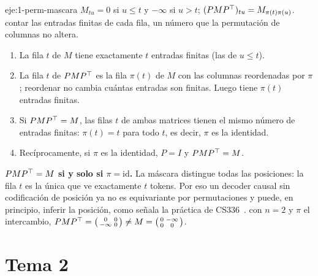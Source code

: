 \begin{solucion}{eje:1-perm-mascara}
\datos $M_{tu}=0$ si $u\le t$ y $-\infty$ si $u>t$; $(PMP^{\top})_{tu}=M_{\pi(t)\pi(u)}$.
\planteamiento contar las entradas finitas de cada fila, un número que la permutación de columnas no altera.
\pasos
\begin{enumerate}[label=\arabic*.]
  \item La fila $t$ de $M$ tiene exactamente $t$ entradas finitas (las de $u\le t$).
  \item La fila $t$ de $PMP^{\top}$ es la fila $\pi(t)$ de $M$ con las columnas reordenadas por $\pi$; reordenar no cambia cuántas entradas son finitas. Luego tiene $\pi(t)$ entradas finitas.
  \item Si $PMP^{\top}=M$, las filas $t$ de ambas matrices tienen el mismo número de entradas finitas: $\pi(t)=t$ para todo $t$, es decir, $\pi$ es la identidad.
  \item Recíprocamente, si $\pi$ es la identidad, $P=I$ y $PMP^{\top}=M$.
\end{enumerate}
\resultado \textbf{$PMP^{\top}=M$ si y solo si $\pi=\mathrm{id}$.} La máscara distingue todas las posiciones: la fila $t$ es la única que ve exactamente $t$ tokens. Por eso un decoder causal sin codificación de posición ya no es equivariante por permutaciones y puede, en principio, inferir la posición, como señala la práctica de CS336~\cite[§7.3]{cs336}.
\comprobacion con $n=2$ y $\pi$ el intercambio, $PMP^{\top}=\bigl(\begin{smallmatrix}0&0\\-\infty&0\end{smallmatrix}\bigr)\ne M=\bigl(\begin{smallmatrix}0&-\infty\\0&0\end{smallmatrix}\bigr)$.
\end{solucion}

\section{Tema 2}

